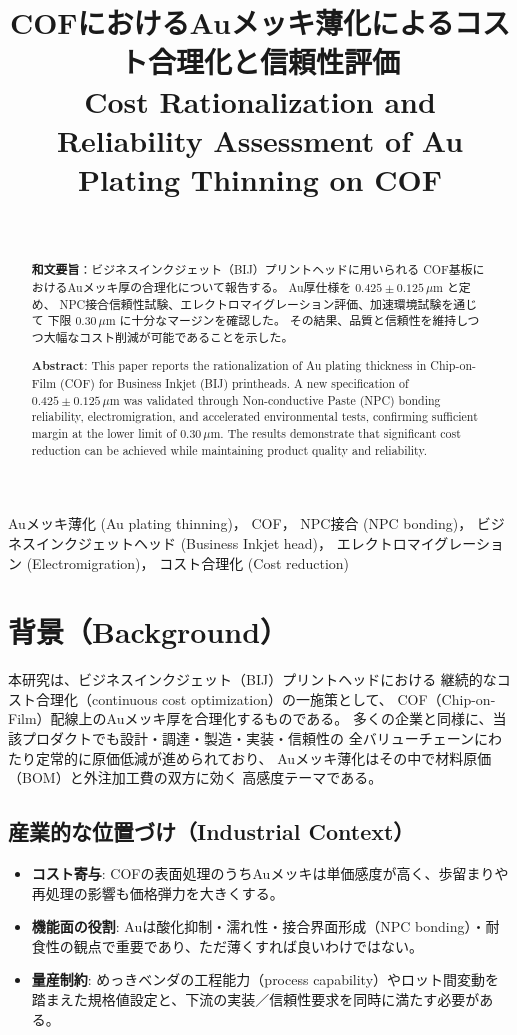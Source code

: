 \documentclass[conference]{IEEEtran}
\title{COFにおけるAuメッキ薄化によるコスト合理化と信頼性評価\\
\large Cost Rationalization and Reliability Assessment of Au Plating Thinning on COF}
\author{%
  \IEEEauthorblockN{三溝 真一（Shinichi Samizo)}\\
  \IEEEauthorblockA{独立系半導体研究者（元セイコーエプソン）\\
  Email: \href{mailto:shin3t72@gmail.com}{shin3t72@gmail.com}\\
  GitHub: \url{https://github.com/Samizo-AITL}}%
}
\begin{document}
\maketitle

\begin{abstract}
\textbf{和文要旨}：ビジネスインクジェット（BIJ）プリントヘッドに用いられる
COF基板におけるAuメッキ厚の合理化について報告する。
Au厚仕様を $0.425 \pm 0.125\,\mu$m と定め、
NPC接合信頼性試験、エレクトロマイグレーション評価、加速環境試験を通じて
下限 $0.30\,\mu$m に十分なマージンを確認した。
その結果、品質と信頼性を維持しつつ大幅なコスト削減が可能であることを示した。

\medskip
\textbf{Abstract}: This paper reports the rationalization of Au plating thickness
in Chip-on-Film (COF) for Business Inkjet (BIJ) printheads.
A new specification of $0.425 \pm 0.125\,\mu$m was validated
through Non-conductive Paste (NPC) bonding reliability, electromigration,
and accelerated environmental tests, confirming sufficient margin at the lower limit of $0.30\,\mu$m.
The results demonstrate that significant cost reduction can be achieved
while maintaining product quality and reliability.
\end{abstract}

\begin{IEEEkeywords}
Auメッキ薄化 (Au plating thinning)，
COF，
NPC接合 (NPC bonding)，
ビジネスインクジェットヘッド (Business Inkjet head)，
エレクトロマイグレーション (Electromigration)，
コスト合理化 (Cost reduction)
\end{IEEEkeywords}

\section{背景（Background）}
本研究は、ビジネスインクジェット（BIJ）プリントヘッドにおける
継続的なコスト合理化（continuous cost optimization）の一施策として、
COF（Chip-on-Film）配線上のAuメッキ厚を合理化するものである。
多くの企業と同様に、当該プロダクトでも設計・調達・製造・実装・信頼性の
全バリューチェーンにわたり定常的に原価低減が進められており、
Auメッキ薄化はその中で材料原価（BOM）と外注加工費の双方に効く
高感度テーマである。

\subsection*{産業的な位置づけ（Industrial Context）}
\begin{itemize}
  \item \textbf{コスト寄与}: COFの表面処理のうちAuメッキは単価感度が高く、歩留まりや再処理の影響も価格弾力を大きくする。
  \item \textbf{機能面の役割}: Auは酸化抑制・濡れ性・接合界面形成（NPC bonding）・耐食性の観点で重要であり、ただ薄くすれば良いわけではない。
  \item \textbf{量産制約}: めっきベンダの工程能力（process capability）やロット間変動を踏まえた規格値設定と、下流の実装／信頼性要求を同時に満たす必要がある。
\end{itemize}
\end{document}
